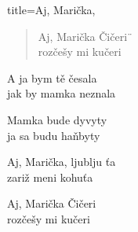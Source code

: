 \begin{song}{
		title=Aj, Marička,
	}

\begin{verse}
Aj, Marička Čičeri¨\\
rozčešy mi kučeri
\end{verse}

\begin{verse*}
A ja bym tě česala\\
jak by mamka neznala
\end{verse*}

\begin{verse*}
Mamka bude dyvyty\\
ja sa budu haňbyty
\end{verse*}

\begin{verse*}
Aj, Marička, ljublju ťa\\
zariž meni kohuťa
\end{verse*}

\begin{verse*}
Aj, Marička Čičeri\\
rozčešy mi kučeri
\end{verse*}
\end{song}